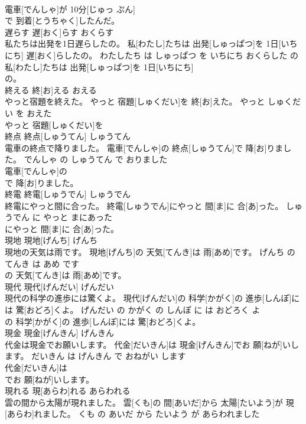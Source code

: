 \documentclass[8pt]{extreport}
\begin{document}
\begin{CJK}{UTF8}{min}
\\	電車[でんしゃ]が 10分[じゅっ ぷん]
\\	で 到着[とうちゃく]したんだ。			
\\	遅らす	遅[おく]らす	おくらす	
\\	私たちは出発を1日遅らしたの。	私[わたし]たちは 出発[しゅっぱつ]を 1日[いちにち] 遅[おく]らしたの。	わたしたち は しゅっぱつ を いちにち おくらした の	
\\	私[わたし]たちは 出発[しゅっぱつ]を 1日[いちにち]
\\	の。			
\\	終える	終[お]える	おえる	
\\	やっと宿題を終えた。	やっと 宿題[しゅくだい]を 終[お]えた。	やっと しゅくだい を おえた	
\\	やっと 宿題[しゅくだい]を
\\	終点	終点[しゅうてん]	しゅうてん	
\\	電車の終点で降りました。	電車[でんしゃ]の 終点[しゅうてん]で 降[お]りました。	でんしゃ の しゅうてん で おりました	
\\	電車[でんしゃ]の
\\	で 降[お]りました。			
\\	終電	終電[しゅうでん]	しゅうでん	
\\	終電にやっと間に合った。	終電[しゅうでん]にやっと 間[ま]に 合[あ]った。	しゅうでん に やっと まにあった	
\\	にやっと 間[ま]に 合[あ]った。			
\\	現地	現地[げんち]	げんち	
\\	現地の天気は雨です。	現地[げんち]の 天気[てんき]は 雨[あめ]です。	げんち の てんき は あめ です	
\\	の 天気[てんき]は 雨[あめ]です。			
\\	現代	現代[げんだい]	げんだい	
\\	現代の科学の進歩には驚くよ。	現代[げんだい]の 科学[かがく]の 進歩[しんぽ]には 驚[おどろ]くよ。	げんだい の かがく の しんぽ に は おどろく よ	
\\	の 科学[かがく]の 進歩[しんぽ]には 驚[おどろ]くよ。			
\\	現金	現金[げんきん]	げんきん	
\\	代金は現金でお願いします。	代金[だいきん]は 現金[げんきん]でお 願[ねが]いします。	だいきん は げんきん で おねがい します	
\\	代金[だいきん]は
\\	でお 願[ねが]いします。			
\\	現れる	現[あらわ]れる	あらわれる	
\\	雲の間から太陽が現れました。	雲[くも]の 間[あいだ]から 太陽[たいよう]が 現[あらわ]れました。	くも の あいだ から たいよう が あらわれました	

\end{CJK}
\end{document}
